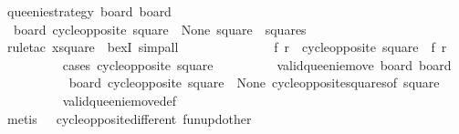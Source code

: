 \begin{isabellebody}
\ {\isachardoublequoteopen}{\isacharquery}queenie{\isacharunderscore}strategy\ board{\isacharprime}\ {\isacharquery}board{\isachardoublequoteclose}\isanewline
\ \ \ \ \ \ \ \ \isamarkupfalse%
\ {\isacharasterisk}\ {\isacharbackquoteopen}board\ {\isacharparenleft}cycle{\isacharunderscore}opposite\ square{\isacharparenright}\ {\isacharequal}\ None{\isacharbackquoteclose}\ {\isacharbackquoteopen}square\ {\isasymin}\ squares{\isacharbackquoteclose}\isanewline
\ \ \ \ \ \ \ \ \isamarkupfalse%
\ {\isacharparenleft}rule{\isacharunderscore}tac\ x{\isacharequal}square\ \ bexI{\isacharcomma}\ simp{\isacharunderscore}all{\isacharparenright}\isanewline
\isanewline
\ \ \ \ \ \ \isamarkupfalse%
\isanewline
\isanewline
\ \ \ \ \ \ \isamarkupfalse%
\ f{\isacharprime}\ r{\isacharprime}\ \ {\isachardoublequoteopen}cycle{\isacharunderscore}opposite\ square\ {\isacharequal}\ {\isacharparenleft}f{\isacharprime}{\isacharcomma}\ r{\isacharprime}{\isacharparenright}{\isachardoublequoteclose}\isanewline
\ \ \ \ \ \ \ \ \isamarkupfalse%
\ {\isacharparenleft}cases\ {\isachardoublequoteopen}cycle{\isacharunderscore}opposite\ square{\isachardoublequoteclose}{\isacharparenright}\isanewline
\ \ \ \ \ \ \isamarkupfalse%
\ \isamarkupfalse%
\ {\isachardoublequoteopen}valid{\isacharunderscore}queenie{\isacharunderscore}move\ board{\isacharprime}\ {\isacharquery}board{\isachardoublequoteclose}\isanewline
\ \ \ \ \ \ \ \ \isamarkupfalse%
\ \ {\isacharbackquoteopen}board\ {\isacharparenleft}cycle{\isacharunderscore}opposite\ square{\isacharparenright}\ {\isacharequal}\ None{\isacharbackquoteclose}\ cycle{\isacharunderscore}opposite{\isacharunderscore}squares{\isacharbrackleft}of\ square{\isacharbrackright}\isanewline
\ \ \ \ \ \ \ \ \isamarkupfalse%
\ valid{\isacharunderscore}queenie{\isacharunderscore}move{\isacharunderscore}def\isanewline
\ \ \ \ \ \ \ \ \isamarkupfalse%
\ {\isacharparenleft}metis\ {\isachardoublequoteopen}{\isacharasterisk}{\isachardoublequoteclose}{\isacharparenleft}{}{\isacharparenright}\ {\isachardoublequoteopen}{\isacharasterisk}{\isachardoublequoteclose}{\isacharparenleft}{}{\isacharparenright}\ cycle{\isacharunderscore}opposite{\isacharunderscore}different\ fun{\isacharunderscore}upd{\isacharunderscore}other{\isacharparenright}\isanewline
\isanewline
\ \ \ \ \ \ \isamarkupfalse%
\isanewline
\ \ \ \ \ \ \isamarkupfalse%

\end{isabellebody}
